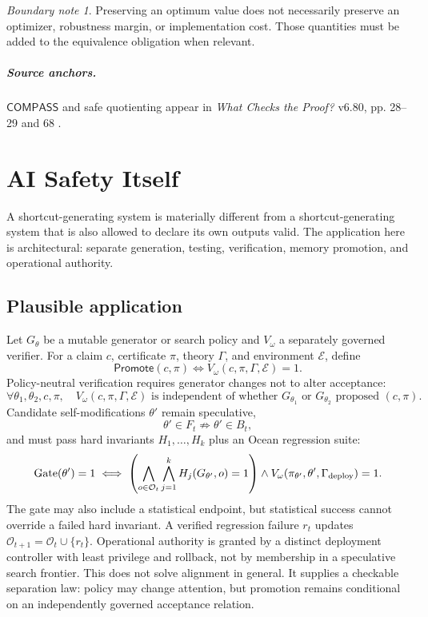 \documentclass[11pt,oneside]{book}
\theoremstyle{definition}
\theoremstyle{remark}
\newtheorem{boundary}[theorem]{Boundary note}
\newcommand{\COMPASS}{\mathsf{COMPASS}}
\newcommand{\OCEAN}{\mathcal O}
\newcommand{\Promote}{\mathsf{Promote}}
\begin{document}
\begin{boundary}
Preserving an optimum value does not necessarily preserve an optimizer, robustness margin, or
implementation cost. Those quantities must be added to the equivalence obligation when relevant.
\end{boundary}

\paragraph{Source anchors.} \(\COMPASS\) and safe quotienting appear in
\emph{What Checks the Proof?} v6.80, pp. 28--29 and 68 \cite{TennesonChecks}.

\chapter{AI Safety Itself}
\label{ch:ai}

A shortcut-generating system is materially different from a shortcut-generating system that is also
allowed to declare its own outputs valid. The application here is architectural: separate generation,
testing, verification, memory promotion, and operational authority.

\section{Plausible application}
Let \(G_\theta\) be a mutable generator or search policy and \(V_\omega\) a separately governed
verifier. For a claim \(c\), certificate \(\pi\), theory \(\Gamma\), and environment \(\mathcal E\),
define
\[
\Promote(c,\pi)
\iff V_\omega(c,\pi,\Gamma,\mathcal E)=1.
\]
Policy-neutral verification requires generator changes not to alter acceptance:
\[
\forall\theta_1,\theta_2,c,\pi,
\quad
V_\omega(c,\pi,\Gamma,\mathcal E)
\text{ is independent of whether }G_{\theta_1}\text{ or }G_{\theta_2}\text{ proposed }(c,\pi).
\]
Candidate self-modifications \(\theta'\) remain speculative,
\[
\theta'\in F_t\not\Rightarrow\theta'\in B_t,
\]
and must pass hard invariants \(H_1,\ldots,H_k\) plus an Ocean regression suite:
\[
\operatorname{Gate}(\theta')=1
\iff
\left(\bigwedge_{o\in\OCEAN_t}\bigwedge_{j=1}^{k}H_j(G_{\theta'},o)=1\right)
\land V_\omega(\pi_{\theta'},\theta',\Gamma_{\rm deploy})=1.
\]
The gate may also include a statistical endpoint, but statistical success cannot override a failed hard
invariant. A verified regression failure \(r_t\) updates \(\OCEAN_{t+1}=\OCEAN_t\cup\{r_t\}\).
Operational authority is granted by a distinct deployment controller with least privilege and rollback,
not by membership in a speculative search frontier. This does not solve alignment in general. It
supplies a checkable separation law: policy may change attention, but promotion remains conditional
on an independently governed acceptance relation.
\end{document}
